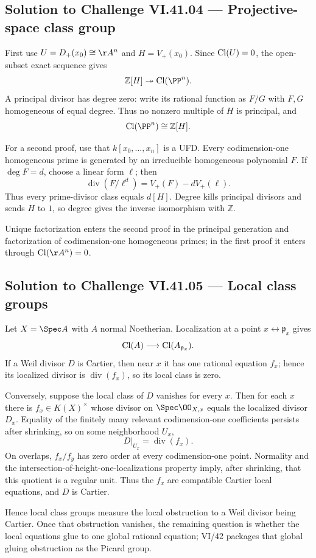 \subsection*{Solution to Challenge VI.41.04 — Projective-space class group}
\begin{solution}
First use \(U=D_+(x_0)\cong\AA^n\) and \(H=V_+(x_0)\). Since
\(\operatorname{Cl}(U)=0\), the open-subset exact sequence gives
\[
\mathbb Z[H]\twoheadrightarrow\Cl(\PP^n).
\]
A principal divisor has degree zero: write its rational function as \(F/G\) with
\(F,G\) homogeneous of equal degree. Thus no nonzero multiple of \(H\) is
principal, and
\[
\Cl(\PP^n)\cong\mathbb Z[H].
\]

For a second proof, use that \(k[x_0,\ldots,x_n]\) is a UFD. Every
codimension-one homogeneous prime is generated by an irreducible homogeneous
polynomial \(F\). If \(\deg F=d\), choose a linear form \(\ell\); then
\[
\operatorname{div}(F/\ell^d)=V_+(F)-dV_+(\ell).
\]
Thus every prime-divisor class equals \(d[H]\). Degree kills principal divisors
and sends \(H\) to \(1\), so degree gives the inverse isomorphism with
\(\mathbb Z\).

Unique factorization enters the second proof in the principal generation and
factorization of codimension-one homogeneous primes; in the first proof it
enters through \(\Cl(\AA^n)=0\).
\end{solution}

\subsection*{Solution to Challenge VI.41.05 — Local class groups}
\begin{solution}
Let \(X=\Spec A\) with \(A\) normal Noetherian. Localization at a point
\(x\leftrightarrow\mathfrak p_x\) gives
\[
\operatorname{Cl}(A)\longrightarrow\operatorname{Cl}(A_{\mathfrak p_x}).
\]
If a Weil divisor \(D\) is Cartier, then near \(x\) it has one rational equation
\(f_x\); hence its localized divisor is \(\operatorname{div}(f_x)\), so its
local class is zero.

Conversely, suppose the local class of \(D\) vanishes for every \(x\). Then for
each \(x\) there is \(f_x\in K(X)^\times\) whose divisor on
\(\Spec\OO_{X,x}\) equals the localized divisor \(D_x\). Equality of the
finitely many relevant codimension-one coefficients persists after shrinking,
so on some neighborhood \(U_x\),
\[
D|_{U_x}=\operatorname{div}(f_x).
\]
On overlaps, \(f_x/f_y\) has zero order at every codimension-one point.
Normality and the intersection-of-height-one-localizations property imply,
after shrinking, that this quotient is a regular unit. Thus the \(f_x\) are
compatible Cartier local equations, and \(D\) is Cartier.

Hence local class groups measure the local obstruction to a Weil divisor being
Cartier. Once that obstruction vanishes, the remaining question is whether the
local equations glue to one global rational equation; VI/42 packages that
global gluing obstruction as the Picard group.
\end{solution}
